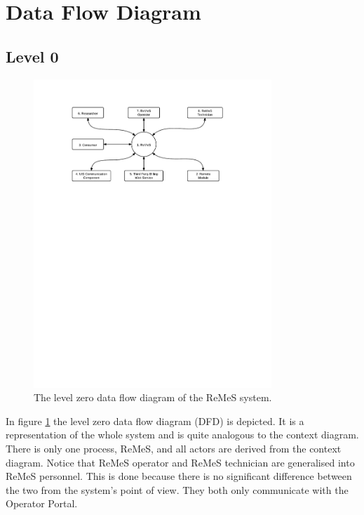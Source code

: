 \section{Data Flow Diagram}
\label{sec:data-flow-diagram}

\subsection{Level 0}

\begin{figure}[h!]
	\begin{centering}
		\includegraphics[width=0.8\textwidth]{figs/level-0.pdf}
		\caption{The level zero data flow diagram of the ReMeS system.}
		\label{fig:data-flow-diagram-lvl0}
	\end{centering}
\end{figure}

\npar In figure \ref{fig:data-flow-diagram-lvl0} the level zero data flow
diagram (DFD) is depicted. It is a representation of the whole system and is quite analogous
to the context diagram. There is only one process, ReMeS, and all actors are
derived from the context diagram. Notice that ReMeS operator and ReMeS
technician are generalised into ReMeS personnel. This is done because there is
no significant difference between the two from the system's point of view. They
both only communicate with the Operator Portal.

